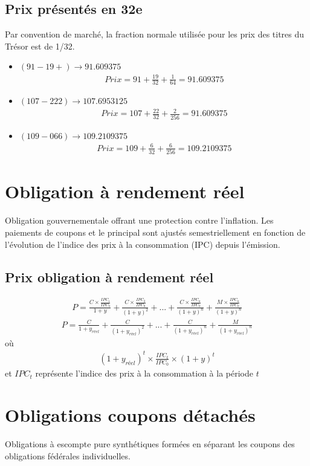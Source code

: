 \documentclass[letterpaper, 12pt]{article}
\newcommand{\1}{\mathds{1}}	%
\theoremstyle{definition}
\begin{document}
\subsection{Prix présentés en 32e}
Par convention de marché, la fraction normale utilisée pour les prix des titres du Trésor est de 1/32. 
\begin{itemize}
\item $(91-19+) \rightarrow 91.609375$
\begin{align*}
Prix=91+\frac{19}{32}+\frac{1}{64}=91.609375
\end{align*}
\item $(107-222) \rightarrow 107.6953125$
\begin{align*}
Prix=107+\frac{22}{32}+\frac{2}{256}=91.609375
\end{align*}
\item $(109-066) \rightarrow 109.2109375$
\begin{align*}
Prix=109+\frac{6}{32}+\frac{6}{256}=109.2109375
\end{align*}
\end{itemize}
\section{Obligation à rendement réel}
Obligation gouvernementale offrant une protection contre l’inflation.  Les paiements de coupons et le principal sont ajustés semestriellement en fonction de l’évolution de l’indice des prix à la consommation (IPC) depuis l’émission.
\subsection{Prix obligation à rendement réel}
\begin{align*}
P=\frac{C \times \frac{IPC_1}{IPC_0}}{1+y}+\frac{C \times \frac{IPC_2}{IPC_0}}{(1+y)^2}+...+\frac{C \times \frac{IPC_n}{IPC_0}}{(1+y)^n}+\frac{M \times \frac{IPC_n}{IPC_0}}{(1+y)^n}
\end{align*}
\begin{align*}
P=\frac{C}{1+y_{réel}}+\frac{C}{(1+y_{réel})^2}+...+\frac{C}{(1+y_{réel})^n}+\frac{M}{(1+y_{réel})^n}
\end{align*}
où
\begin{align*}
(1+y_{réel})^t \times \frac{IPC_t}{IPC_0} \times (1+y)^t
\end{align*}
et $IPC_t$ représente l'indice des prix à la consommation à la période $t$
\section{Obligations coupons détachés}
Obligations à escompte pure synthétiques formées en séparant les coupons des obligations fédérales individuelles.
\end{document}
